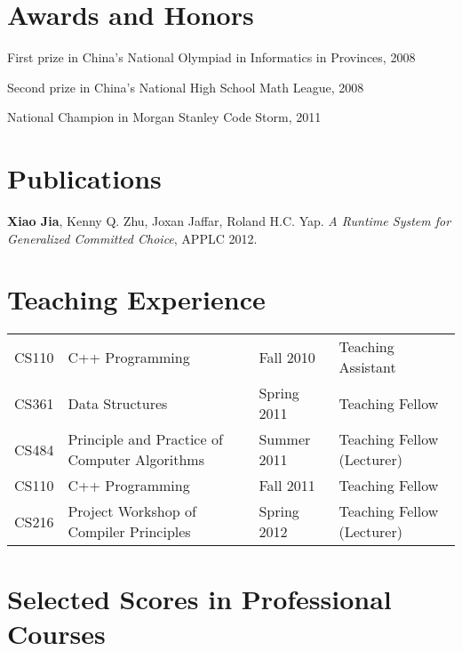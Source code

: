 \documentclass[letterpaper]{article}
\renewenvironment{itemize}{
  \begin{list}{}{
    \setlength{\leftmargin}{1.5em}
    \vspace{-1mm}
  }
}{
  \end{list}
}
\begin{document}
\vspace{-7mm}
\section*{Awards and Honors}

\begin{itemize}
  \item First prize in China's National Olympiad in Informatics in Provinces, 2008
  \item Second prize in China's National High School Math League, 2008
  \item National Champion in Morgan Stanley Code Storm, 2011
\end{itemize}


\vspace{-7mm}
\section*{Publications}

\begin{itemize}
  \item \textbf{Xiao Jia}, Kenny Q. Zhu, Joxan Jaffar, Roland H.C. Yap. \emph{A Runtime System for Generalized Committed Choice}, APPLC 2012.
\end{itemize}


\vspace{-7mm}
\section*{Teaching Experience}

\vspace{-1mm}
\begin{tabular}{clll}
  CS110 & C++ Programming & Fall 2010 & Teaching Assistant \\
  CS361 & Data Structures & Spring 2011 & Teaching Fellow \\
  CS484 & Principle and Practice of Computer Algorithms & Summer 2011 & Teaching Fellow (Lecturer) \\
  CS110 & C++ Programming & Fall 2011 & Teaching Fellow \\
  CS216 & Project Workshop of Compiler Principles & Spring 2012 & Teaching Fellow (Lecturer)
\end{tabular}


\vspace{-2mm}
\section*{Selected Scores in Professional Courses}
\end{document}
